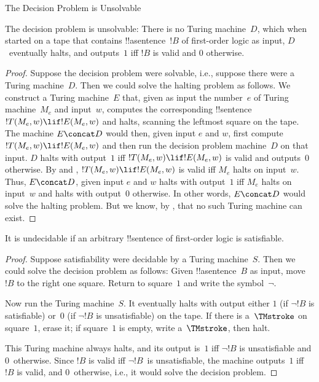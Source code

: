 \documentclass[../../../include/open-logic-section]{subfiles}
\begin{document}
 {The Decision Problem is Unsolvable}

\begin{thm}
The decision problem is unsolvable: There is no Turing machine~$D$,
which when started on a tape that contains !!a{sentence}~$!B$ of
first-order logic as input, $D$~eventually halts, and outputs~$1$ iff
$!B$ is valid and $0$ otherwise.
\end{thm}

\begin{proof}
Suppose the decision problem were solvable, i.e., suppose there were a
Turing machine~$D$. Then we could solve the halting problem as
follows. We construct a Turing machine~$E$ that, given as input the
number~$e$ of Turing machine~$M_e$ and input~$w$, computes the
corresponding !!{sentence}~$!T(M_e, w) \lif !E(M_e, w)$ and halts,
scanning the leftmost square on the tape.  The machine $E \concat D$
would then, given input $e$ and $w$, first compute~$!T(M_e, w) \lif
!E(M_e, w)$ and then run the decision problem machine~$D$ on that
input.  $D$ halts with output~$1$ iff $!T(M_e, w) \lif !E(M_e, w)$ is
valid and outputs~$0$ otherwise. By  and
, $!T(M_e, w) \lif !E(M_e, w)$ is valid
iff $M_e$ halts on input~$w$. Thus, $E\concat D$, given input $e$ and
$w$ halts with output~$1$ iff $M_e$ halts on input~$w$ and halts with
output~$0$ otherwise. In other words, $E \concat D$ would solve the
halting problem.  But we know, by ,
that no such Turing machine can exist.
\end{proof}

\begin{cor}%
It is undecidable if an arbitrary !!{sentence} of first-order logic is satisfiable.
\end{cor}

\begin{proof}
  Suppose satisfiability were decidable by a Turing machine~$S$. Then
  we could solve the decision problem as follows: Given
  !!a{sentence}~$B$ as input, move $!B$ to the right one square.
  Return to square~$1$ and write the symbol~$\lnot$.

  Now run the Turing machine~$S$. It eventually halts with output
  either $1$ (if $\lnot !B$ is satisfiable) or~$0$ (if $\lnot !B$ is
  unsatisfiable) on the tape. If there is a~$\TMstroke$ on square~$1$,
  erase it; if square~$1$ is empty, write a~$\TMstroke$, then halt.

  This Turing machine always halts, and its output is~$1$ iff $\lnot
  !B$ is unsatisfiable and $0$~otherwise. Since $!B$ is valid iff
  $\lnot !B$~is unsatisfiable, the machine outputs~$1$ iff $!B$ is
  valid, and $0$~otherwise, i.e., it would solve the decision problem.
\end{proof}
\end{document}

